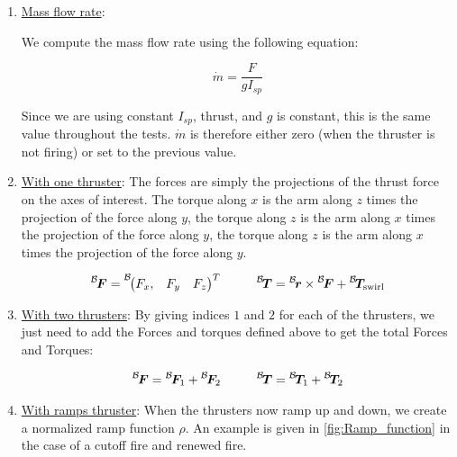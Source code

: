\begin{enumerate}
	
	\item{\underline{Mass flow rate}}: 
	
	We compute the mass flow rate using the following equation:
	
	\begin{equation}
	\dot{m} = \frac{F}{g I_{sp}}
	\end{equation}
	
	Since we are using constant $I_{sp}$, thrust, and $g$ is constant, this is the same value throughout the tests. $\dot{m}$ is therefore either zero (when the thruster is not firing) or set to the previous value. 
	
	\item{\underline{With one thruster}}: The forces are simply the projections of the thrust force on the axes of interest. The torque along $x$ is the arm along $z$ times the projection of the force along $y$, the torque along $z$ is the arm along $x$ times the projection of the force along $y$, the torque along $z$ is the arm along $x$ times the projection of the force along $y$. 
	
	\begin{align}
		\leftexp{B}{\bm F} =\leftexp{B}{\begin{pmatrix} F_x, & F_y & F_z \end{pmatrix}}^T&\hspace{1cm} \leftexp{B}{\bm T} =\leftexp{B}{\bm r} \times \leftexp{B}{\bm F} +  \leftexp{B}{\bm T}_{\mathrm{swirl}}\\
	\end{align}
	
	
	\item{\underline{With two thrusters}}: By giving indices $1$ and $2$ for each of the thrusters, we just need to add the Forces and torques defined above to get the total Forces and Torques:
	
	\begin{align}
		\leftexp{B}{\bm F} = \leftexp{B}{\bm F_1}  + \leftexp{B}{\bm F_2} &\hspace{1cm} \leftexp{B}{\bm T} = \leftexp{B}{\bm T_1}  + \leftexp{B}{\bm T_2} \\ 
	\end{align}
	
	\item{\underline{With ramps thruster}}: When the thrusters now ramp up and down, we create a normalized ramp function $\rho$. An example is given in \ref{fig:Ramp_function} in the case of a cutoff fire and renewed fire. \par
	

\end{enumerate}
